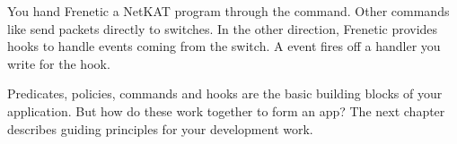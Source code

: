 You hand Frenetic a NetKAT program through the  command.  Other commands like  send
packets directly to switches.  In the other direction, Frenetic provides hooks to handle events coming from the
switch.  A  event fires off a handler you write for the  hook.  

Predicates, policies, commands and hooks are the basic building blocks of your application.  But how do these work 
together to form an app?  The next chapter describes guiding principles for your development work.  